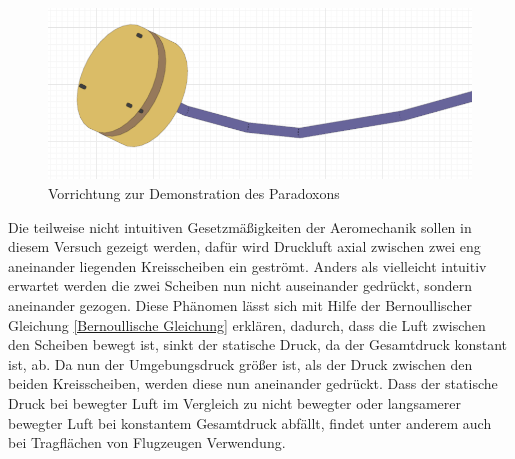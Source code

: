 \begin{figure}[h!]
    \centering
    \includegraphics[scale=0.5]{./Aeromechanik/Protokoll/fig/paradoxon.png}
    \caption{Vorrichtung zur Demonstration des Paradoxons}
    \label{fig:Venturi}
\end{figure}

Die teilweise nicht intuitiven Gesetzmäßigkeiten der Aeromechanik sollen in diesem Versuch gezeigt werden, dafür wird Druckluft axial zwischen zwei eng aneinander liegenden Kreisscheiben ein geströmt. Anders als vielleicht intuitiv erwartet werden die zwei Scheiben nun nicht auseinander gedrückt, sondern aneinander gezogen. Diese Phänomen lässt sich mit Hilfe der Bernoullischer Gleichung \ref{Bernoullische Gleichung} erklären, dadurch, dass die Luft zwischen den Scheiben bewegt ist, sinkt der statische Druck, da der Gesamtdruck konstant ist, ab. Da nun der Umgebungsdruck größer ist, als der Druck zwischen den beiden Kreisscheiben, werden diese nun aneinander gedrückt. Dass der statische Druck bei bewegter Luft im Vergleich zu nicht bewegter oder langsamerer bewegter Luft bei konstantem Gesamtdruck abfällt, findet unter anderem auch bei Tragflächen von Flugzeugen Verwendung.